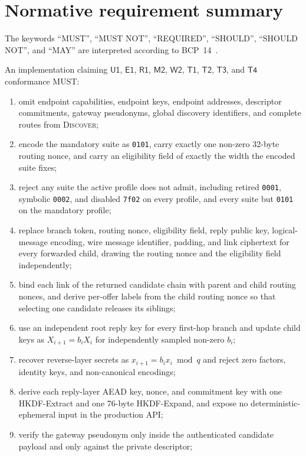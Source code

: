 \documentclass[11pt,oneside]{article}
\newcommand{\Uone}{\ensuremath{\mathsf{U1}}}
\newcommand{\Eone}{\ensuremath{\mathsf{E1}}}
\newcommand{\Rone}{\ensuremath{\mathsf{R1}}}
\newcommand{\Mtwo}{\ensuremath{\mathsf{M2}}}
\newcommand{\Wtwo}{\ensuremath{\mathsf{W2}}}
\newcommand{\Tone}{\ensuremath{\mathsf{T1}}}
\newcommand{\Ttwo}{\ensuremath{\mathsf{T2}}}
\newcommand{\Tthree}{\ensuremath{\mathsf{T3}}}
\newcommand{\Tfour}{\ensuremath{\mathsf{T4}}}
\newcommand{\code}[1]{\texttt{#1}}
\begin{document}
\appendix
\section{Normative requirement summary}
\label{app:normative}

The keywords ``MUST'', ``MUST NOT'', ``REQUIRED'', ``SHOULD'', ``SHOULD NOT'', and ``MAY'' are interpreted according to BCP~14~\cite{rfc2119,rfc8174}.

An implementation claiming \Uone{}, \Eone{}, \Rone{}, \Mtwo{}, \Wtwo{}, \Tone{}, \Ttwo{}, \Tthree{}, and \Tfour{} conformance MUST:

\begin{enumerate}
  \item omit endpoint capabilities, endpoint keys, endpoint addresses, descriptor commitments, gateway pseudonyms, global discovery identifiers, and complete routes from \textsc{Discover};
  \item encode the mandatory suite as \code{0101}, carry exactly one non-zero 32-byte routing nonce, and carry an eligibility field of exactly the width the encoded suite fixes;
  \item reject any suite the active profile does not admit, including retired \code{0001}, symbolic \code{0002}, and disabled \code{7f02} on every profile, and every suite but \code{0101} on the mandatory profile;
  \item replace branch token, routing nonce, eligibility field, reply public key, logical-message encoding, wire message identifier, padding, and link ciphertext for every forwarded child, drawing the routing nonce and the eligibility field independently;
  \item bind each link of the returned candidate chain with parent and child routing nonces, and derive per-offer labels from the child routing nonce so that selecting one candidate releases its siblings;
  \item use an independent root reply key for every first-hop branch and update child keys as $X_{i+1}=b_iX_i$ for independently sampled non-zero $b_i$;
  \item recover reverse-layer secrets as $x_{i+1}=b_ix_i\bmod q$ and reject zero factors, identity keys, and non-canonical encodings;
  \item derive each reply-layer AEAD key, nonce, and commitment key with one HKDF-Extract and one 76-byte HKDF-Expand, and expose no deterministic-ephemeral input in the production API;
  \item verify the gateway pseudonym only inside the authenticated candidate payload and only against the private descriptor;

\end{enumerate}
\end{document}
